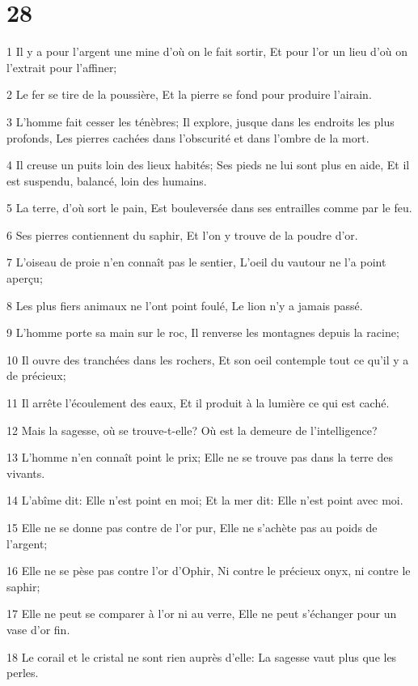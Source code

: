 \chapter{28}

\par 1 Il y a pour l'argent une mine d'où on le fait sortir, Et pour l'or un lieu d'où on l'extrait pour l'affiner;
\par 2 Le fer se tire de la poussière, Et la pierre se fond pour produire l'airain.
\par 3 L'homme fait cesser les ténèbres; Il explore, jusque dans les endroits les plus profonds, Les pierres cachées dans l'obscurité et dans l'ombre de la mort.
\par 4 Il creuse un puits loin des lieux habités; Ses pieds ne lui sont plus en aide, Et il est suspendu, balancé, loin des humains.
\par 5 La terre, d'où sort le pain, Est bouleversée dans ses entrailles comme par le feu.
\par 6 Ses pierres contiennent du saphir, Et l'on y trouve de la poudre d'or.
\par 7 L'oiseau de proie n'en connaît pas le sentier, L'oeil du vautour ne l'a point aperçu;
\par 8 Les plus fiers animaux ne l'ont point foulé, Le lion n'y a jamais passé.
\par 9 L'homme porte sa main sur le roc, Il renverse les montagnes depuis la racine;
\par 10 Il ouvre des tranchées dans les rochers, Et son oeil contemple tout ce qu'il y a de précieux;
\par 11 Il arrête l'écoulement des eaux, Et il produit à la lumière ce qui est caché.
\par 12 Mais la sagesse, où se trouve-t-elle? Où est la demeure de l'intelligence?
\par 13 L'homme n'en connaît point le prix; Elle ne se trouve pas dans la terre des vivants.
\par 14 L'abîme dit: Elle n'est point en moi; Et la mer dit: Elle n'est point avec moi.
\par 15 Elle ne se donne pas contre de l'or pur, Elle ne s'achète pas au poids de l'argent;
\par 16 Elle ne se pèse pas contre l'or d'Ophir, Ni contre le précieux onyx, ni contre le saphir;
\par 17 Elle ne peut se comparer à l'or ni au verre, Elle ne peut s'échanger pour un vase d'or fin.
\par 18 Le corail et le cristal ne sont rien auprès d'elle: La sagesse vaut plus que les perles.
